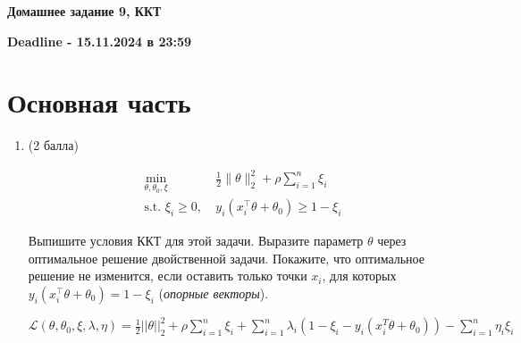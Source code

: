 \documentclass[a5paper,twoside,russian]{article}
\begin{document}
    \begin{center}
        \textbf{Домашнее задание 9, ККТ}
    \end{center}
    \begin{center}
        \textbf{Deadline - 15.11.2024 в 23:59}
    \end{center}

    \section*{Основная часть}

    \begin{enumerate}[label=\textbf{Задача \arabic*.}]

        \item (2 балла)

        \begin{align*}
            \min_{\theta, \theta_0, \xi} &~ \frac{1}{2}\|\theta\|_2^2 + \rho\sum\limits_{i = 1}^{n}\xi_i\\
            \text{s.t. } \xi_i \geq 0, &~ y_i(x_i^\top \theta + \theta_0) \geq 1 - \xi_i
        \end{align*}

        Выпишите условия ККТ для этой задачи.
        Выразите параметр $\theta$ через оптимальное решение двойственной задачи.
        Покажите, что оптимальное решение не изменится, если оставить только точки $x_i$,
        для которых $y_i(x_i^\top \theta + \theta_0) = 1 - \xi_i$ (\emph{опорные векторы}).

        \begin{prf}
            $ \mathcal{L} (\theta, \theta_0, \xi, \lambda, \eta) =
            \frac12 ||\theta||_2^2 + \rho \sum\limits_{i=1}^{n}\xi_i +
            \sum\limits_{i=1}^{n}\lambda_i \left(1 - \xi_i - y_i \left( x_i^T \theta + \theta_0 \right) \right) -
            \sum\limits_{i=1}^{n} \eta_i \xi_i $


\end{prf}
\end{enumerate}
\end{document}
